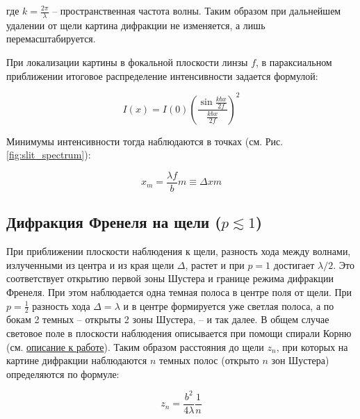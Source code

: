 \documentclass[a4paper,12pt]{article} %
\begin{document}
 где $k = \frac{2 \pi}{\lambda}$ -- пространственная частота волны. Таким образом при дальнейшем удалении от щели картина дифракции не изменяется, а лишь перемасштабируется. 
 
 При локализации картины в фокальной плоскости линзы $f$, в параксиальном приближении итоговое распределение интенсивности задается формулой:

\begin{equation}
    I(x) = I(0) \left(\frac{\sin \frac{k b x}{2 f}}{\frac{k b x}{2 f}}\right)^2
\end{equation}

Минимумы интенсивности тогда наблюдаются в точках (см. Рис. \ref{fig:slit_spectrum}):

\begin{equation}
    \boxed{x_m = \frac{\lambda f} {b} m \equiv \Delta x m}
    \label{eq:fraun}
\end{equation}

\subsection{Дифракция Френеля на щели ($p \lesssim 1$)}

При приближении плоскости наблюдения к щели, разность хода между волнами, излученными из центра и из края щели $\Delta$, растет и при $p = 1$ достигает $\lambda/2$. Это соответствует открытию первой зоны Шустера и границе режима дифракции Френеля. При этом наблюдается одна темная полоса в центре поля от щели. При $p = \frac{1}{2}$ разность хода $\Delta = \lambda$ и в центре формируется уже светлая полоса, а по бокам 2 темных -- открыты 2 зоны Шустера, -- и так далее. В общем случае световое поле в плоскости наблюдения описывается при помощи спирали Корню (см. \href{https://mipt.ru/upload/Кафедра%20общей%20физики/3/4.3.1.%20Дифракция%20света.pdf}{описание к работе}). Таким образом расстояния до щели $z_n$, при которых на картине дифракции наблюдаются $n$ темных полос (открыто $n$ зон Шустера) определяются по формуле:

\begin{equation}
    \boxed{z_n = \frac{b^2}{4 \lambda} \frac{1}{n}}
    \label{eq:fren}
\end{equation}
\end{document}
